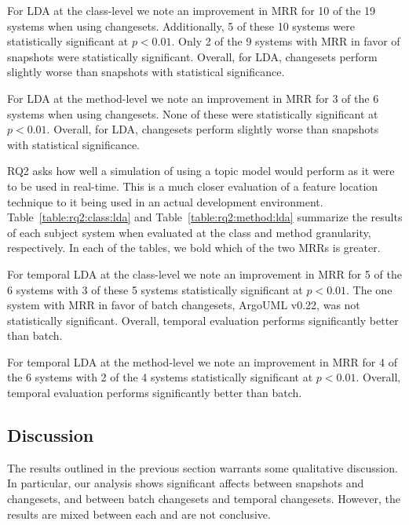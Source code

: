 For LDA at the class-level we note an improvement in MRR for 10 of the 19 systems when using changesets.
Additionally, 5 of these 10 systems were statistically significant at $p<0.01$.
Only 2 of the 9 systems with MRR in favor of snapshots were statistically significant.
Overall, for LDA, changesets perform slightly worse than snapshots with statistical significance.

For LDA at the method-level we note an improvement in MRR for 3 of the 6 systems when using changesets.
None of these were statistically significant at $p<0.01$.
Overall, for LDA, changesets perform slightly worse than snapshots with statistical significance.





RQ2 asks how well a simulation of using a topic model would perform as it were to be used in real-time.
This is a much closer evaluation of a feature location technique to it being used in an actual development environment.
Table~\ref{table:rq2:class:lda} and Table~\ref{table:rq2:method:lda}
summarize the results of each subject system when
evaluated at the class and method granularity, respectively.
In each of the tables, we bold which of the two MRRs is greater.

For temporal LDA at the class-level we note an improvement in MRR for 5 of the 6 systems
with 3 of these 5 systems statistically significant at $p<0.01$.
The one system with MRR in favor of batch changesets, ArgoUML v0.22, was not statistically significant.
Overall, temporal evaluation performs significantly better than batch.

For temporal LDA at the method-level we note an improvement in MRR for 4 of the 6 systems
with 2 of the 4 systems statistically significant at $p<0.01$.
Overall, temporal evaluation performs significantly better than batch.



\subsection{Discussion}

The results outlined in the previous section warrants some qualitative discussion.
In particular, our analysis shows significant affects between snapshots and changesets,
and between batch changesets and temporal changesets.
However, the results are mixed between each and are not conclusive.

